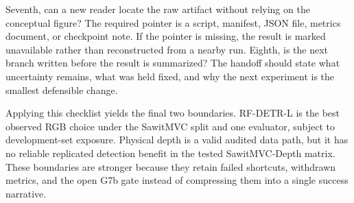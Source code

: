 \documentclass[preprint,12pt]{elsarticle}
\begin{document}
Seventh, can a new reader locate the raw artifact without relying on the
conceptual figure? The required pointer is a script, manifest, JSON file,
metrics document, or checkpoint note. If the pointer is missing, the result is
marked unavailable rather than reconstructed from a nearby run. Eighth, is the
next branch written before the result is summarized? The handoff should state
what uncertainty remains, what was held fixed, and why the next experiment is
the smallest defensible change.

Applying this checklist yields the final two boundaries. RF-DETR-L is the best
observed RGB choice under the SawitMVC split and one evaluator, subject to
development-set exposure. Physical depth is a valid audited data path, but it
has no reliable replicated detection benefit in the tested SawitMVC-Depth
matrix. These boundaries are stronger because they
retain failed shortcuts, withdrawn metrics, and the open G7b gate instead of
compressing them into a single success narrative.

\clearpage


\end{document}
